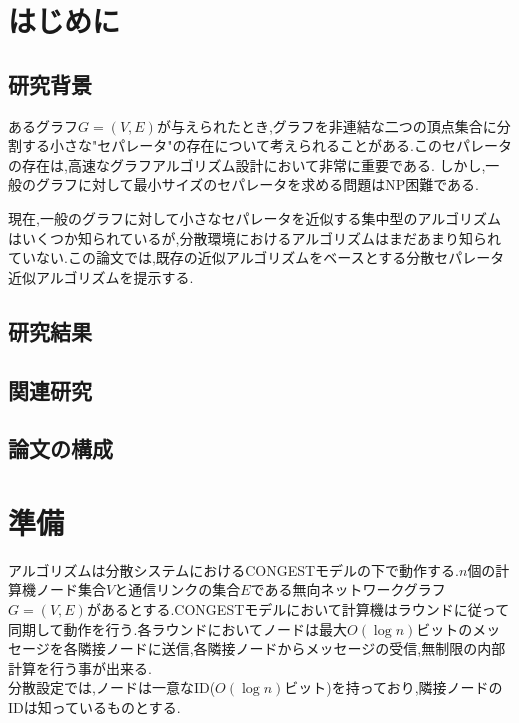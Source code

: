 \documentclass{thesis}
\theoremstyle{definition}
\begin{document}
\baselineskip=22pt
\pagestyle{empty}

\maketitle

\pagestyle{myheadings}	%
\tableofcontents

\newpage


\chapter{はじめに}

\section{研究背景}

あるグラフ$G=(V,E)$が与えられたとき,グラフを非連結な二つの頂点集合に分割する小さな"セパレータ"の存在について考えられることがある.このセパレータの存在は,高速なグラフアルゴリズム設計において非常に重要である.
しかし,一般のグラフに対して最小サイズのセパレータを求める問題はNP困難である.\par
現在,一般のグラフに対して小さなセパレータを近似する集中型のアルゴリズムはいくつか知られているが,分散環境におけるアルゴリズムはまだあまり知られていない.この論文では,既存の近似アルゴリズムをベースとする分散セパレータ近似アルゴリズムを提示する.

\section{研究結果}

\section{関連研究}

\section{論文の構成}

\chapter{準備}
アルゴリズムは分散システムにおけるCONGESTモデルの下で動作する.$n$個の計算機ノード集合$V$と通信リンクの集合$E$である無向ネットワークグラフ$G=(V,E)$があるとする.CONGESTモデルにおいて計算機はラウンドに従って同期して動作を行う.各ラウンドにおいてノードは最大$O(\log n)$ビットのメッセージを各隣接ノードに送信,各隣接ノードからメッセージの受信,無制限の内部計算を行う事が出来る.\\
分散設定では,ノードは一意なID($O(\log n)$ビット)を持っており,隣接ノードのIDは知っているものとする.\par
\end{document}
